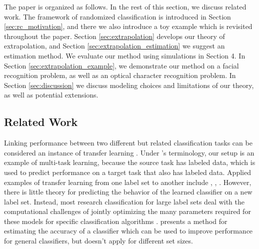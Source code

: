 \documentclass[twoside,11pt]{article}
\begin{document}
The paper is organized as follows.  In the rest of this section, we
discuss related work.  The framework of randomized classification is
introduced in Section \ref{sec:rc_motivation}, and there we also
introduce a toy example which is revisited throughout the
paper. Section \ref{sec:extrapolation} develops our theory of
extrapolation, and Section \ref{sec:extrapolation_estimation} we
suggest an estimation method. We evaluate our method using simulations in Section 4.
In Section
\ref{sec:extrapolation_example}, we demonstrate our method on a facial
recognition problem, as well as an optical character recognition problem. In Section \ref{sec:discussion} we
discuss modeling choices and limitations of our theory, as well as
potential extensions.

\subsection{Related Work}

Linking performance between two different but related classification
tasks can be considered an instance of transfer learning
\citep{pan2010survey}. Under \citeauthor{pan2010survey}'s terminology,
our setup is an example of multi-task learning, because the source
task has labeled data, which is used to predict performance on a
target task that also has labeled data. Applied examples of transfer learning from one label set to another include \cite{oquab2014learning},
\cite{donahue2014decaf}, \cite{sharif2014cnn}. 
However, there is little theory for predicting the behavior of the learned classifier on a new label set. Instead, most research classification for large label sets deal with the computational challenges of jointly optimizing the many parameters
required for these models for specific classification algorithms \citep{crammer2001algorithmic,
  lee2004multicategory, weston1999support}. \cite{gupta2014training}
presents a method for estimating the accuracy of a classifier which can
be used to improve performance for general classifiers, but doesn't apply for different set sizes.  
\end{document}
